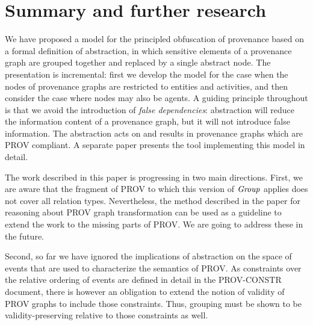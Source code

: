 
\section{Summary and further research}
\label{sec:further}

We have proposed a model for the principled obfuscation of provenance based on a formal definition of abstraction, in which sensitive elements of a provenance graph are grouped together and replaced by a single abstract node.  The presentation is incremental: first we develop the model for the case when the nodes of provenance graphs are restricted to entities and activities, and then consider the case where nodes may also be agents.  A guiding principle  throughout is that we avoid the introduction of \emph{false dependencies}: abstraction will reduce the information content of a provenance graph, but it will not introduce false information.  
The abstraction acts on and results in provenance graphs which are PROV compliant.   A separate paper presents the tool implementing this model in detail.


The work described in this paper is progressing in two main directions.
%
First, we are aware that the fragment of PROV to which this version of $\mathit{Group}$ applies does not cover all relation types. Nevertheless, the method described in the paper for reasoning about PROV graph transformation can be used as a guideline to extend the work to the missing parts of PROV. We are going to address these in the future.

Second, so far we have ignored the implications of abstraction on the space of events that are used to characterize the semantics of PROV. As constraints over the relative ordering of events are defined in detail in the PROV-CONSTR document, there is however an obligation to extend the notion of validity of PROV graphs to include those constraints. Thus, grouping must be shown to be validity-preserving relative to those constraints as well. 


